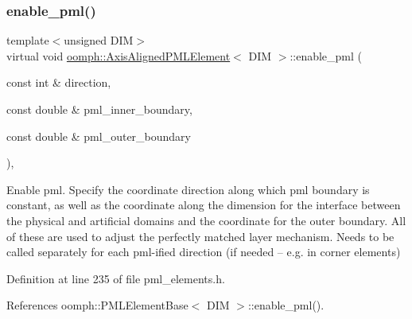 \subsubsection{\texorpdfstring{enable\+\_\+pml()}{enable\_pml()}\hspace{0.1cm}{\footnotesize\ttfamily [1/2]}}
{\footnotesize\ttfamily template$<$unsigned D\+IM$>$ \\
virtual void \hyperlink{classoomph_1_1AxisAlignedPMLElement}{oomph\+::\+Axis\+Aligned\+P\+M\+L\+Element}$<$ D\+IM $>$\+::enable\+\_\+pml (\begin{DoxyParamCaption}\item[{const int \&}]{direction,  }\item[{const double \&}]{pml\+\_\+inner\+\_\+boundary,  }\item[{const double \&}]{pml\+\_\+outer\+\_\+boundary }\end{DoxyParamCaption})\hspace{0.3cm}{\ttfamily [inline]}, {\ttfamily [virtual]}}



Enable pml. Specify the coordinate direction along which pml boundary is constant, as well as the coordinate along the dimension for the interface between the physical and artificial domains and the coordinate for the outer boundary. All of these are used to adjust the perfectly matched layer mechanism. Needs to be called separately for each pml-\/ified direction (if needed -- e.\+g. in corner elements) 



Definition at line 235 of file pml\+\_\+elements.\+h.



References oomph\+::\+P\+M\+L\+Element\+Base$<$ D\+I\+M $>$\+::enable\+\_\+pml().

\mbox{\label{classoomph_1_1AxisAlignedPMLElement_a157cd9d30c5d1f86d17b4b25bc705f76}} 
